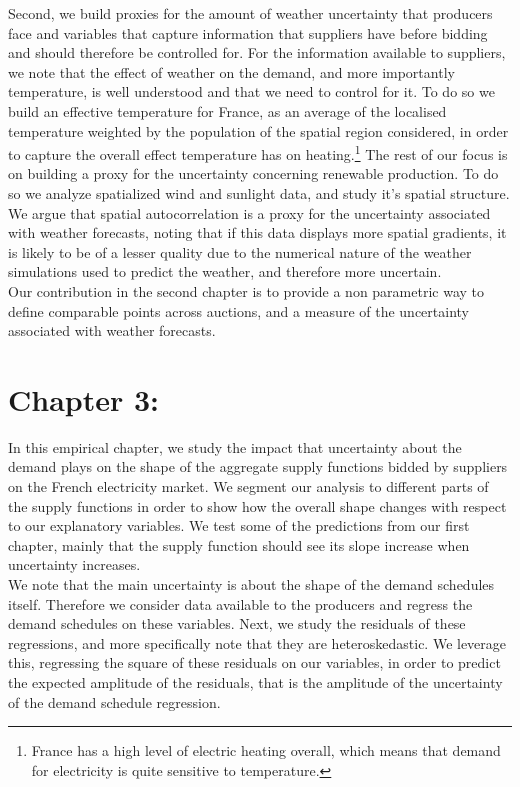 Second, we build proxies for the amount of weather uncertainty that producers face and variables that capture information that suppliers have before bidding and should therefore be controlled for. For the information available to suppliers, we note that the effect of weather on the demand, and more importantly temperature, is well understood and that we need to control for it. To do so we build an effective temperature for France, as an average of the localised temperature weighted by the population of the spatial region considered, in order to capture the overall effect temperature has on heating.\footnote{France has a high level of electric heating overall, which means that demand for electricity is quite sensitive to temperature.} The rest of our focus is on building a proxy for the uncertainty concerning renewable production. To do so we analyze spatialized wind and sunlight data, and study it's spatial structure. We argue that spatial autocorrelation is a proxy for the uncertainty associated with weather forecasts, noting that if this data displays more spatial gradients, it is likely to be of a lesser quality due to the numerical nature of the weather simulations used to predict the weather, and therefore more uncertain.\\

Our contribution in the second chapter is to provide a non parametric way to define comparable points across auctions, and a measure of the uncertainty associated with weather forecasts.\\

\section*{Chapter 3: }

In this empirical chapter, we study the impact that uncertainty about the demand plays on the shape of the aggregate supply functions bidded by suppliers on the French electricity market. We segment our analysis to different parts of the supply functions in order to show how the overall shape changes with respect to our explanatory variables. We test some of the predictions from our first chapter, mainly that the supply function should see its slope increase when uncertainty increases. \\

We note that the main uncertainty is about the shape of the demand schedules itself. Therefore we consider data available to the producers and regress the demand schedules on these variables. Next, we study the residuals of these regressions, and more specifically note that they are heteroskedastic. We leverage this, regressing the square of these residuals on our variables, in order to predict the expected amplitude of the residuals, that is the amplitude of the uncertainty of the demand schedule regression.\\

